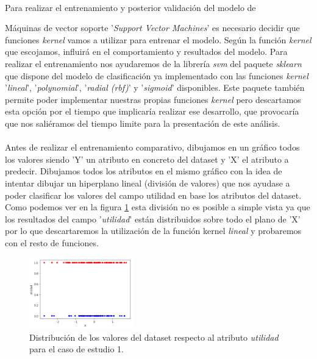 \paragraph{}
Para realizar el entrenamiento y posterior validación del modelo de {Máquinas de vector soporte '\textit{Support Vector Machines}' es necesario decidir que funciones \textit{kernel} vamos a utilizar para entrenar el modelo. Según la función \textit{kernel} que escojamos, influirá en el comportamiento y resultados del modelo. Para realizar el entrenamiento nos ayudaremos de la librería \textit{svm} del paquete \textit{sklearn} que dispone del modelo de clasificación\cite{ref:svm_sklearn_svc} ya implementado con las funciones \textit{kernel} '\textit{lineal}', '\textit{polynomial}', '\textit{radial (rbf)}' y '\textit{sigmoid}'\cite{ref:svm_kernels_sklearn} disponibles. Este paquete también permite poder implementar nuestras propias funciones \textit{kernel} pero descartamos esta opción por el tiempo que implicaría realizar ese desarrollo, que provocaría que nos saliéramos del tiempo limite para la presentación de este análisis.

\paragraph{}
Antes de realizar el entrenamiento comparativo, dibujamos en un gráfico todos los valores siendo 'Y' un atributo en concreto del dataset y 'X' el atributo a predecir. Dibujamos todos los atributos en el mismo gráfico con la idea de intentar dibujar un hiperplano lineal (división de valores) que nos ayudase a poder clasificar los valores del campo utilidad en base los atributos del dataset. Como podemos ver en la figura \ref{svmDistribution} esta división no es posible a simple vista ya que los resultados del campo '\textit{utilidad}' están distribuidos sobre todo el plano de 'X' por lo que descartaremos la utilización de la función kernel \textit{lineal} y probaremos con el resto de funciones.

\begin{figure}[!htb]
  \centering
    \includegraphics[width=0.4\textwidth]{images/resultados_svm_distribucion.png}
    \caption{Distribución de los valores del dataset respecto al atributo \textit{utilidad} para el caso de estudio 1.}
  \label{svmDistribution}
\end{figure}

}
